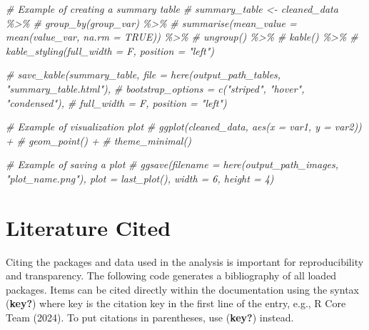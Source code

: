 \documentclass[
]{article}
\newenvironment{Shaded}{\begin{snugshade}}{\end{snugshade}}
\newcommand{\CommentTok}[1]{\textcolor[rgb]{0.56,0.35,0.01}{\textit{#1}}}
\begin{document}
\begin{Shaded}
\begin{Highlighting}[]
\CommentTok{\# Example of creating a summary table }
\CommentTok{\# summary\_table \textless{}{-} cleaned\_data \%\textgreater{}\%}
\CommentTok{\#   group\_by(group\_var) \%\textgreater{}\%}
\CommentTok{\#   summarise(mean\_value = mean(value\_var, na.rm = TRUE)) \%\textgreater{}\%}
\CommentTok{\#   ungroup() \%\textgreater{}\%}
\CommentTok{\#   kable() \%\textgreater{}\%}
\CommentTok{\#   kable\_styling(full\_width = F, position = "left") }

\CommentTok{\# save\_kable(summary\_table, file = here(output\_path\_tables, "summary\_table.html"),}
\CommentTok{\#   bootstrap\_options = c("striped", "hover", "condensed"),}
\CommentTok{\#   full\_width = F, position = "left")}
\end{Highlighting}
\end{Shaded}

\begin{Shaded}
\begin{Highlighting}[]
\CommentTok{\# Example of visualization plot}
\CommentTok{\# ggplot(cleaned\_data, aes(x = var1, y = var2)) +}
\CommentTok{\#   geom\_point() +}
\CommentTok{\#   theme\_minimal()}

\CommentTok{\# Example of saving a plot}
\CommentTok{\# ggsave(filename = here(output\_path\_images, "plot\_name.png"), plot = last\_plot(), width = 6, height = 4)}
\end{Highlighting}
\end{Shaded}

\section{Literature Cited}\label{literature-cited}

Citing the packages and data used in the analysis is important for
reproducibility and transparency. The following code generates a
bibliography of all loaded packages. Items can be cited directly within
the documentation using the syntax (\textbf{key?}) where key is the
citation key in the first line of the entry, e.g., R Core Team (2024).
To put citations in parentheses, use (\textbf{key?}) instead.
\end{document}
